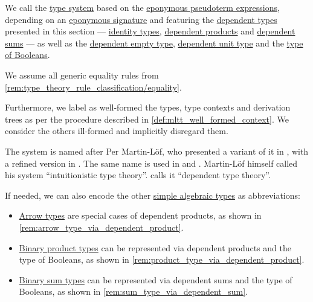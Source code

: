 \begin{definition}\label{def:martin_lof_type_theory}\mimprovised
  We call  the \hyperref[def:abstract_type_system]{type system} based on the \hyperref[def:mltt_pseudoterm]{eponymous pseudoterm expressions}, depending on an \hyperref[def:mltt_signature]{eponymous signature} and featuring the \hyperref[con:dependent_type]{dependent types} presented in this section --- \hyperref[def:identity_type]{identity types}, \hyperref[def:dependent_product]{dependent products} and \hyperref[def:dependent_sum]{dependent sums} --- as well as the \hyperref[def:dependent_empty_type]{dependent empty type}, \hyperref[def:dependent_unit_type]{dependent unit type} and the \hyperref[def:type_of_booleans]{type of Booleans}.

  We assume all generic equality rules from \cref{rem:type_theory_rule_classification/equality}.

  Furthermore, we label as well-formed the types, type contexts and derivation trees as per the procedure described in \cref{def:mltt_well_formed_context}. We consider the others ill-formed and implicitly disregard them.
\end{definition}
\begin{comments}
  \item The system is named after Per Martin-L\"of, who presented a variant of it in \cite{MartinLöf1975IntuitionisticTypeTheory}, with a refined version in \cite{MartinLöf1984IntuitionisticTypeTheory}. The same name is used in \cite{UnivalentFoundationsProgram2013HoTT} and \cite[ch. 8]{Mimram2020ProgramEqualsProof}. Martin-L\"of himself called his system \enquote{intuitionistic type theory}. \cite[ch. 8]{Mimram2020ProgramEqualsProof} calls it \enquote{dependent type theory}.

  \item If needed, we can also encode the other \hyperref[def:simple_algebraic_types]{simple algebraic types} as abbreviations:
  \begin{itemize}
    \item \hyperref[def:arrow_type]{Arrow types} are special cases of dependent products, as shown in \cref{rem:arrow_type_via_dependent_product}.
    \item \hyperref[def:simple_product_type]{Binary product types} can be represented via dependent products and the type of Booleans, as shown in \cref{rem:product_type_via_dependent_product}.
    \item \hyperref[def:simple_sum_type]{Binary sum types} can be represented via dependent sums and the type of Booleans, as shown in \cref{rem:sum_type_via_dependent_sum}.
  \end{itemize}
\end{comments}

